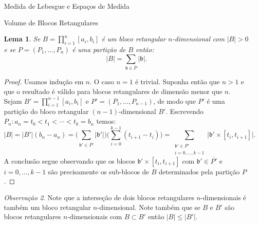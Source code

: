 \documentclass[oneside,final,11pt]{amsbook}
\theoremstyle{remark}\newtheorem{exercise}{Exercício}[chapter]
\theoremstyle{remark}\newtheorem{*exercise}[exercise]{\hbox to 0pt{\hskip 0pt minus 1fil*}Exercício}
\theoremstyle{definition}\newtheorem{exdefin}{Definição}[chapter]
\theoremstyle{plain}\newtheorem{teo}{Teorema}[section]
\theoremstyle{plain}\newtheorem{lem}[teo]{Lema}
\theoremstyle{plain}\newtheorem{prop}[teo]{Proposição}
\theoremstyle{plain}\newtheorem{cor}[teo]{Corolário}
\theoremstyle{definition}\newtheorem{defin}[teo]{Definição}
\theoremstyle{remark}\newtheorem{rem}[teo]{Observação}
\theoremstyle{definition}\newtheorem{notation}[teo]{Notação}
\theoremstyle{definition}\newtheorem{convention}[teo]{Convenção}
\theoremstyle{definition}\newtheorem{example}[teo]{Exemplo}
\numberwithin{section}{chapter}
\numberwithin{equation}{section}
\begin{document}
\begin{chapter}{Medida de Lebesgue e Espaços de Medida}
\begin{section}{Volume de Blocos Retangulares}
\begin{lem}\label{thm:particionabloco}
Se $B=\prod_{i=1}^n[a_i,b_i]$ é um bloco retangular $n$-dimensional com $\vert B\vert>0$
e se $P=(P_1,\ldots,P_n)$ é uma partição de $B$ então:
\[\vert B\vert=\sum_{\mathfrak b\in\overline P}\vert\mathfrak b\vert.\]
\end{lem}
\begin{proof}
Usamos indução em $n$. O caso $n=1$ é trivial. Suponha então que $n>1$ e que o resultado é válido para blocos retangulares de dimensão menor
que $n$. Sejam $B'=\prod_{i=1}^{n-1}[a_i,b_i]$ e $P'=(P_1,\ldots,P_{n-1})$, de modo que $P'$ é uma partição
do bloco retangular $(n-1)$-dimensional $B'$. Escrevendo $P_n:a_n=t_0<t_1<\cdots<t_k=b_n$ temos:
\[\vert B\vert=\vert B'\vert(b_n-a_n)=\Big(\sum_{\mathfrak b'\in\overline{P'}}\vert\mathfrak b'\vert\Big)
\Big(\sum_{i=0}^{k-1}(t_{i+1}-t_i)\Big)
=\!\!\!\!\sum_{\substack{\mathfrak b'\in\overline{P'}\\
i=0,\ldots,k-1}}\!\!\!\big\vert\mathfrak b'\times[t_i,t_{i+1}]\big\vert.\]
A conclusão segue observando que os blocos $\mathfrak b'\times[t_i,t_{i+1}]$ com $\mathfrak b'\in\overline{P'}$ e
$i=0,\ldots,k-1$ são precisamente os sub-blocos de $B$ determinados pela partição $P$.
\end{proof}

\begin{rem}\label{thm:remintermonot}
Note que a interseção de dois blocos retangulares $n$-di\-men\-sio\-nais é também um bloco retangular $n$-dimensional.
Note também que se $B$ e $B'$ são blocos retangulares $n$-dimensionais com $B\subset B'$ então
$\vert B\vert\le\vert B'\vert$.
\end{rem}


\end{section}
\end{chapter}
\end{document}
